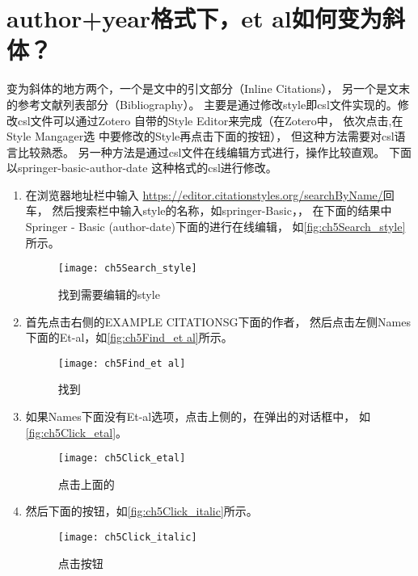 \documentclass[cn,11pt,chinese]{elegantbook}
\begin{document}
		\section{author+year格式下，et al如何变为斜体？}\label{sec:etal_italic}
			变为斜体的地方两个，一个是文中的引文部分（Inline Citations），
			另一个是文末的参考文献列表部分（Bibliography）。
			主要是通过修改style即csl文件实现的。修改csl文件可以通过Zotero
			自带的Style Editor来完成（在Zotero中，
			依次点击,在Style Mangager选
			中要修改的Style再点击下面的按钮），
			但这种方法需要对csl语言比较熟悉。
			另一种方法是通过csl文件在线编辑方式进行，操作比较直观。
			下面以springer-basic-author-date 这种格式的csl进行修改。	
			\begin{enumerate}
				\item 
				在浏览器地址栏中输入
				\href{https://editor.citationstyles.org/searchByName/}
				{https://editor.citationstyles.org/searchByName/}回车，
				然后搜索栏中输入style的名称，如springer-Basic，，
				在下面的结果中Springer - Basic (author-date)下面的进行在线编辑，
				如\autoref{fig:ch5Search_style}所示。
				\begin{figure}[htbp]
					\centering
					\texttt{[image: ch5Search\_style]}
					\caption{找到需要编辑的style}
					\label{fig:ch5Search_style}
				\end{figure}
			\item 首先点击右侧的EXAMPLE CITATIONSG下面的作者，
			然后点击左侧Names下面的Et-al，如\autoref{fig:ch5Find_et al}所示。
				\begin{figure}[htbp]
					\centering
					\texttt{[image: ch5Find\_et al]}
					\caption{找到}
					\label{fig:ch5Find_et al}
				\end{figure}
			\item 如果Names下面没有Et-al选项，点击上侧的\menu{+}，在弹出的对话框中，
			如\autoref{fig:ch5Click_etal}。
				\begin{figure}[htbp]
					\centering
					\texttt{[image: ch5Click\_etal]}
					\caption{点击上面的\menu{+}}
					\label{fig:ch5Click_etal}
				\end{figure}
			\item 然后下面的按钮，如\autoref{fig:ch5Click_italic}所示。
				\begin{figure}[htbp]
					\centering
					\texttt{[image: ch5Click\_italic]}
					\caption{点击按钮}
					\label{fig:ch5Click_italic}
				\end{figure}
			\end{enumerate}
\end{document}
